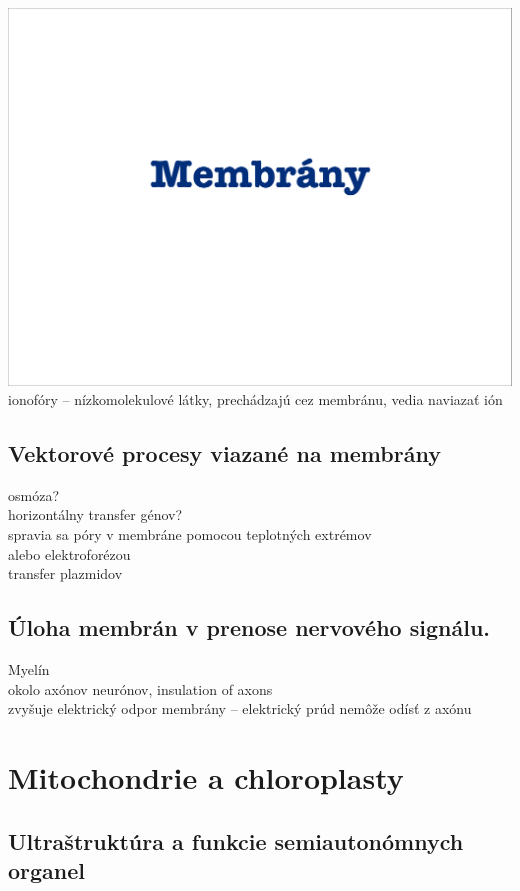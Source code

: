 \includegraphics[width=1\textwidth, page=32]{materials/Bunkova_biologia/prednasky_zaklady_bunkovej_biologie/07_ZBB07-Membrany.pdf}\\
ionofóry -- nízkomolekulové látky, prechádzajú cez membránu, vedia naviazať ión\\
\subsection{Vektorové procesy viazané na membrány}
osmóza?\\
horizontálny transfer génov?\\
\tab spravia sa póry v membráne pomocou teplotných extrémov\\
\tab alebo elektroforézou\\
\tab transfer plazmidov\\
\subsection{Úloha membrán v prenose nervového signálu.}
Myelín \\
\tab okolo axónov neurónov, insulation of axons\\
\tab zvyšuje elektrický odpor membrány -- elektrický prúd nemôže odísť z axónu\\

\section{Mitochondrie a chloroplasty}

\subsection{Ultraštruktúra a funkcie semiautonómnych organel}

